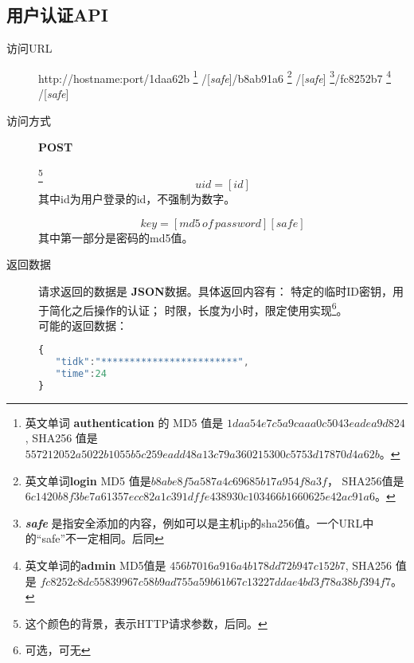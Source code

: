 \documentclass[UTF8]{article}
\def\safe{/[\textit{safe}]}
\def\POST{\colorbox[rgb]{0.77,0.53,0.97}{\textbf{POST}}}
\def\bfJSON{\textbf{JSON}}
\def\viaurl{\item[{\quad\colorbox[rgb]{0.47,0.88,0.89}{访问URL}}]}
\def\viareq#1{\item[{\quad\colorbox[rgb]{0.57,0.88,0.99}{访问方式}}] #1}
\def\rtdata{\item[{\quad\colorbox[rgb]{0.70,0.9,0.59}{返回数据}}]}
\begin{document}
    \subsection{用户认证API}%



    \begin{description}

        \viaurl http://hostname:port/1daa62b
        \footnote{
            英文单词 \textbf{authentication} 的
            MD5 值是
            $1daa54e7c5a9caaa0c5043eadea9d824$,
            SHA256 值是
            $557212052a5022b1055b5c259eadd48a13c79a360215300c5753d17870d4a62b$。
        }
        \safe/b8ab91a6
        \footnote{
            英文单词\textbf{login}  MD5 值是$b8abe8f5a587a4c69685b17a954f8a3f$，
            SHA256值是
            $6c1420b8f3be7a61357ecc82a1c391dffe438930c103466b1660625e42ac91a6$。
        }
        \safe
        \footnote{\textit{\textbf{safe}} 是指安全添加的内容，例如可以是主机ip的sha256值。一个URL中的“safe”不一定相同。后同}/fc8252b7
        \footnote{
            英文单词的\textbf{admin}
            MD5值是 $456b7016a916a4b178dd72b947c152b7 $,
            SHA256 值是
            $fc8252c8dc55839967c58b9ad755a59b61b67c13227ddae4bd3f78a38bf394f7$。
        }
        \safe

        \viareq \POST

        \label{par:id}
        \footnote{这个颜色的背景，表示HTTP请求参数，后同。}
        $$uid=[id]$$
        其中id为用户登录的id，不强制为数字。

        \label{par:key}
         $$key=[md5\, of\, password][safe]$$
         其中第一部分是密码的md5值。

        \rtdata 请求返回的数据是 \bfJSON 数据。具体返回内容有：
        特定的临时ID密钥，用于简化之后操作的认证；
        时限，长度为小时，限定使用实现\footnote{可选，可无}。
         \\ 可能的返回数据：
        \begin{lstlisting}[language=JavaScript]
{
   "tidk":"************************",
   "time":24
}
        \end{lstlisting}


    \end{description}
\end{document}
